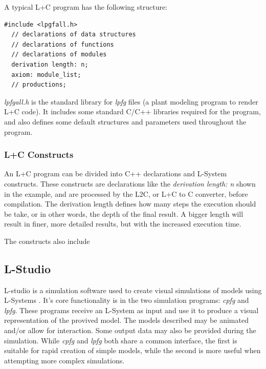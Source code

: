 \documentclass{acmtog}
\begin{document}
A typical L+C program has the following structure:

\begin{lstlisting}[label={lst:lc_example}]
  #include <lpgfall.h>
  // declarations of data structures
  // declarations of functions
  // declarations of modules
  derivation length: n;
  axiom: module_list;
  // productions;
\end{lstlisting}

\emph{lpfgall.h} is the standard library for \emph{lpfg} files (a plant modeling program to render L+C code). It includes some standard C/C++ libraries required for the program, and also defines some default structures and parameters used throughout the program.

\subsubsection{L+C Constructs}
\label{subsubsec:constructs}

An L+C program can be divided into C++ declarations and L-System constructs. These constructs are declarations like the \emph{derivation length: n} shown in the example, and are processed by the L2C, or L+C to C converter, before compilation. The derivation length defines how many steps the execution should be take, or in other words, the depth of the final result. A bigger length will result in finer, more detailed results, but with the increased execution time.

The constructs also include

\subsection{L-Studio}
\label{subsec:lstudio}

L-studio is a simulation software used to create visual simulations of models using L-Systems \cite{LSTUDIO}.
It's core functionality is in the two simulation programs: \emph{cpfg} and \emph{lpfg}. These programs receive an L-System as input and use it to produce a visual representation of the provived model. The models described may be animated and/or allow for interaction. Some output data may also be provided during the simulation. While \emph{cpfg} and \emph{lpfg} both share a common interface, the first is suitable for rapid creation of simple models, while the second is more useful when attempting more complex simulations.

\end{document}
